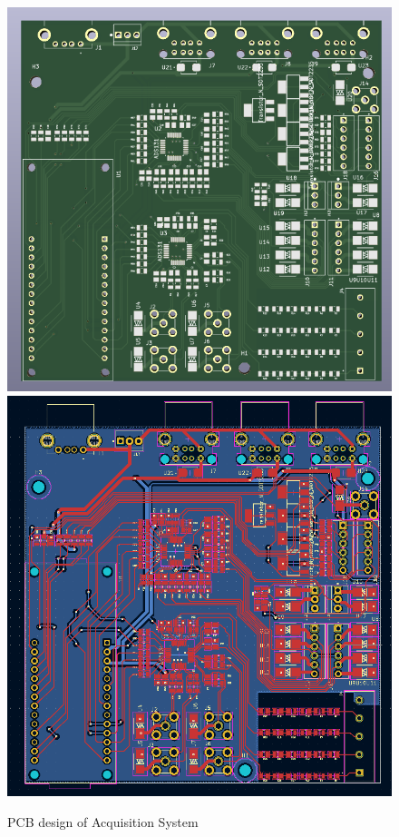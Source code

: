 \begin{figure}[htbp]
\centering
\includegraphics[scale=0.55]{images/Valise.png}
\includegraphics[scale=0.42]{images/PCB Valise.png}
\caption{PCB design of Acquisition System}
\label{fig:x PCB design}
\end{figure}

